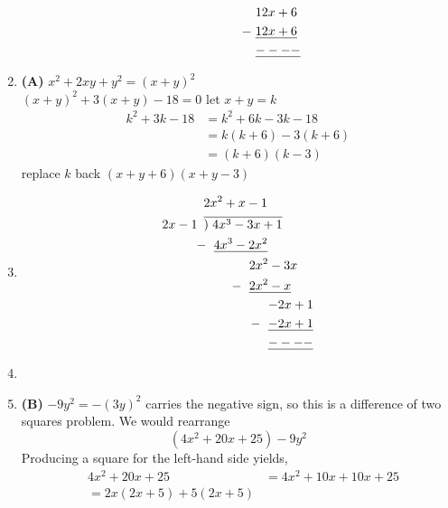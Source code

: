 \begin{multicols}{2}
\begin{enumerate}[label={\textbf{\arabic*.}}]
\begin{align*}
& \hspace{63pt} 12x + 6 \\
- \hspace{-60pt} & \hspace{63pt} \underline{12x + 6} \\
& \hspace{63pt} \underline{----}
\end{align*}
\item \textbf{(A)} \( x^2 + 2xy + y^2 = (x+y)^2 \) \\
\( (x+y)^2 + 3(x+y) - 18 = 0 \) let \( x+y = k \)
\begin{align*}
k^2 + 3k - 18 &= k^2 + 6k - 3k - 18 \\
&= k(k+6) - 3(k+6) \\
&= (k+6)(k-3)
\end{align*}
replace \( k \) back \( (x+y+6)(x+y-3) \)
\item
\begin{align*}
& 2x^2 + x - 1  \\
2x - 1 \hspace{5pt} & \overline{)\hspace{3pt} 4x^3 - 3x + 1} \\
-\hspace{-2pt} & \hspace{8pt} \underline{4x^3 - 2x^2} \\
& \hspace{36pt} 2x^2 - 3x \\
-\hspace{-30pt} & \hspace{36pt} \underline{2x^2 - x} \\
& \hspace{51pt} {-2x + 1} \\
-\hspace{-45pt} & \hspace{51pt} \underline{-2x + 1} \\
& \hspace{51pt} \underline{----}
\end{align*}
\item
\item \textbf{(B)} \( -9y^2 = -(3y)^2 \) carries the negative sign, so this is a difference of two squares problem. We would rearrange
\[(4x^2 + 20x + 25) - 9y^2 \]
Producing a square for the left-hand side yields,
\begin{align*}
&4x^2 + 20x + 25
&= 4x^2 + 10x + 10x + 25 \\
&= 2x(2x + 5) + 5(2x + 5) \\

\end{align*}
\end{enumerate}
\end{multicols}
